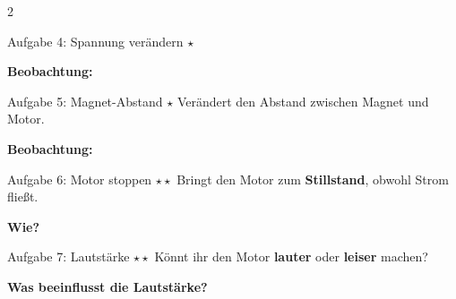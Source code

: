 \documentclass[10pt, a4paper]{article}
\newcommand{\sternI}{$\star$}
\newcommand{\sternII}{$\star\star$}
\begin{document}
\begin{multicols}{2}
\begin{aufgabenbox}{Aufgabe 4: Spannung verändern \hfill \sternI}
\begin{antwortbox}
\textbf{Beobachtung:}

\vspace{0.6cm}
\end{antwortbox}
\end{aufgabenbox}

\begin{aufgabenbox}{Aufgabe 5: Magnet-Abstand \hfill \sternI}
\small
Verändert den Abstand zwischen Magnet und Motor.

\begin{antwortbox}
\textbf{Beobachtung:}

\vspace{0.6cm}
\end{antwortbox}
\end{aufgabenbox}

\begin{aufgabenbox}{Aufgabe 6: Motor stoppen \hfill \sternII}
\small
Bringt den Motor zum \textbf{Stillstand}, obwohl Strom fließt.

\begin{antwortbox}
\textbf{Wie?}

\vspace{0.6cm}
\end{antwortbox}
\end{aufgabenbox}

\begin{aufgabenbox}{Aufgabe 7: Lautstärke \hfill \sternII}
\small
Könnt ihr den Motor \textbf{lauter} oder \textbf{leiser} machen?

\begin{antwortbox}
\textbf{Was beeinflusst die Lautstärke?}

\vspace{0.5cm}
\end{antwortbox}
\end{aufgabenbox}

\end{multicols}

\end{document}
